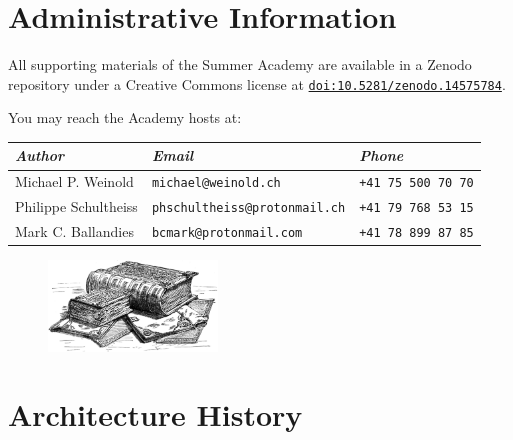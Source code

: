 \documentclass[a4paper]{article}
\begin{document}
\section*{\centering Administrative Information}

All supporting materials of the Summer Academy are available in a Zenodo repository under a Creative Commons license at \href{https://doi.org/10.5281/zenodo.14575784}{\texttt{doi:10.5281/zenodo.14575784}}.

You may reach the Academy hosts at:

\begin{NiceTabularX}{\textwidth}{llX}
\textit{Author} & \textit{Email} & \textit{Phone} \\
\hline
Michael P. Weinold & \texttt{michael@weinold.ch} & \texttt{+41 75 500 70 70} \\
Philippe Schultheiss & \texttt{phschultheiss@protonmail.ch} & \texttt{+41 79 768 53 15} \\
Mark C. Ballandies & \texttt{bcmark@protonmail.com} & \texttt{+41 78 899 87 85}
\end{NiceTabularX}

\begin{figure}[h]
  \centering
  \includegraphics[width=0.4\textwidth]{./figures/books.jpg}
\end{figure}

\tableofcontents

\clearpage
\section{Architecture History}
\end{document}
